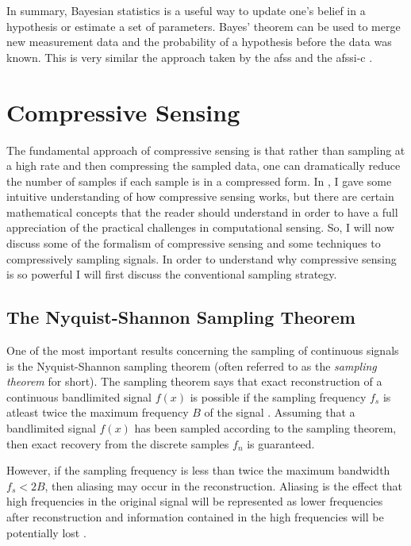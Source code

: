 In summary, Bayesian statistics is a useful way to update one's belief in a hypothesis or estimate a set of parameters. Bayes' theorem can be used to merge new measurement data and the probability of a hypothesis before the data was known. This is very similar the approach taken by the \gls{afss} and the \gls{afssi-c} \cite{dinakarababu2011adaptive, dunlop2016experimental}. 

\section{Compressive Sensing}\label{sec:compressiveSesing}

The fundamental approach of \gls{compressive sensing} is that rather than sampling at a high rate and then compressing the sampled data, one can dramatically reduce the number of samples if each sample is in a compressed form. In  , I gave some intuitive understanding of how \gls{compressive sensing} works, but there are certain mathematical concepts that the reader should understand in order to have a full appreciation of the practical challenges in computational sensing. So, I will now discuss some of the formalism of compressive sensing and some techniques to compressively sampling signals. In order to understand why compressive sensing is so powerful I will first discuss the conventional sampling strategy.

\subsection{The Nyquist-Shannon Sampling Theorem}

One of the most important results concerning the \gls{sampling} of continuous signals is the Nyquist-Shannon sampling theorem (often referred to as the \emph{sampling theorem} for short). The sampling theorem says that exact reconstruction of a continuous \gls{bandlimited signal} $f(x)$ is possible if the sampling frequency $f_s$ is atleast twice the maximum frequency $ B $ of the signal \cite{shannon1949communication}. Assuming that a bandlimited signal $f(x)$ has been sampled according to the sampling theorem, then exact recovery from the discrete samples $f_n$ is guaranteed.

However, if the sampling frequency is less than twice the maximum bandwidth $f_s < 2B$, then aliasing may occur in the reconstruction. Aliasing is the effect that high frequencies in the original signal will be represented as lower frequencies after reconstruction and information contained in the high frequencies will be potentially lost \cite{proakis1988introduction}. 

